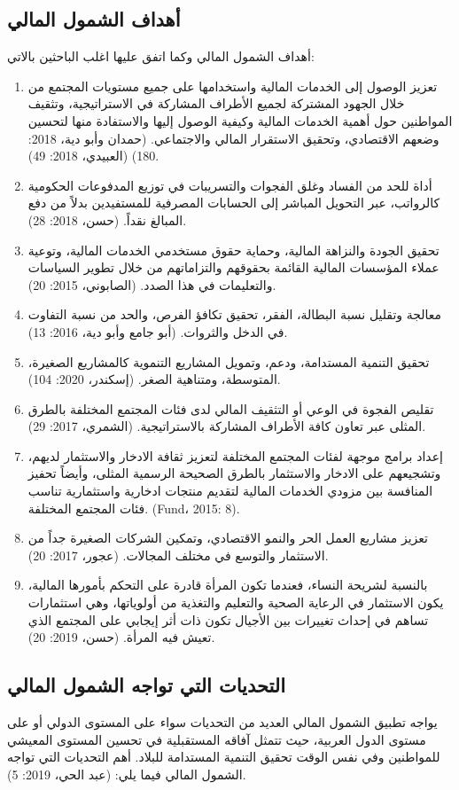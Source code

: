 \documentclass[10pt,a4paper]{report}
\begin{document}
\begin{doublespacing}
\subsection{أهداف الشمول المالي}
أهداف الشمول المالي وكما اتفق عليها اغلب الباحثين بالاتي:
\begin{enumerate}
	\item تعزيز الوصول إلى الخدمات المالية واستخدامها على جميع مستويات المجتمع من خلال الجهود المشتركة لجميع الأطراف المشاركة في الاستراتيجية، وتثقيف المواطنين حول أهمية الخدمات المالية وكيفية الوصول إليها والاستفادة منها لتحسين وضعهم الاقتصادي، وتحقيق الاستقرار المالي والاجتماعي. (حمدان وأبو دية، 2018: 180) (العبيدي، 2018: 49).
	\item أداة للحد من الفساد وغلق الفجوات والتسريبات في توزيع المدفوعات الحكومية كالرواتب، عبر التحويل المباشر إلى الحسابات المصرفية للمستفيدين بدلاً من دفع المبالغ نقداً. (حسن، 2018: 28).
	\item تحقيق الجودة والنزاهة المالية، وحماية حقوق مستخدمي الخدمات المالية، وتوعية عملاء المؤسسات المالية القائمة بحقوقهم والتزاماتهم من خلال تطوير السياسات والتعليمات في هذا الصدد. (الصابوني، 2015: 20).
	\item معالجة وتقليل نسبة البطالة، الفقر، تحقيق تكافؤ الفرص، والحد من نسبة التفاوت في الدخل والثروات. (أبو جامع وأبو دية، 2016: 13).
	\item تحقيق التنمية المستدامة، ودعم، وتمويل المشاريع التنموية كالمشاريع الصغيرة، المتوسطة، ومتناهية الصغر. (إسكندر، 2020: 104).
	\item تقليص الفجوة في الوعي أو التثقيف المالي لدى فئات المجتمع المختلفة بالطرق المثلى عبر تعاون كافة الأطراف المشاركة بالاستراتيجية. (الشمري، 2017: 29).
	\item إعداد برامج موجهة لفئات المجتمع المختلفة لتعزيز ثقافة الادخار والاستثمار لديهم، وتشجيعهم على الادخار والاستثمار بالطرق الصحيحة الرسمية المثلى، وأيضاً تحفيز المنافسة بين مزودي الخدمات المالية لتقديم منتجات ادخارية واستثمارية تناسب فئات المجتمع المختلفة. (Fund، 2015: 8).
	\item تعزيز مشاريع العمل الحر والنمو الاقتصادي، وتمكين الشركات الصغيرة جداً من الاستثمار والتوسع في مختلف المجالات. (عجور، 2017: 20).
	\item بالنسبة لشريحة النساء، فعندما تكون المرأة قادرة على التحكم بأمورها المالية، يكون الاستثمار في الرعاية الصحية والتعليم والتغذية من أولوياتها، وهي استثمارات تساهم في إحداث تغييرات بين الأجيال تكون ذات أثر إيجابي على المجتمع الذي تعيش فيه المرأة. (حسن، 2019: 20).
\end{enumerate}
\subsection{التحديات التي تواجه الشمول المالي}
يواجه تطبيق الشمول المالي العديد من التحديات سواء على المستوى الدولي أو على مستوى الدول العربية، حيث تتمثل آفاقه المستقبلية في تحسين المستوى المعيشي للمواطنين وفي نفس الوقت تحقيق التنمية المستدامة للبلاد. أهم التحديات التي تواجه الشمول المالي فيما يلي: (عبد الحي، 2019: 5).


\end{doublespacing}
\end{document}
